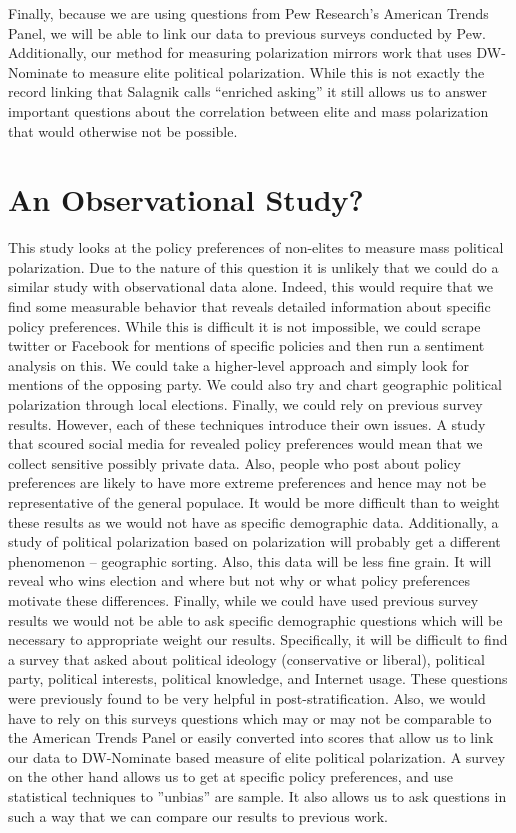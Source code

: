 \documentclass[12pt]{article}
\begin{document}
 Finally, because we are using questions from Pew Research's American Trends Panel, we will be able to link our data to previous surveys conducted by Pew. Additionally, our method for measuring polarization mirrors work that uses DW-Nominate to measure elite political polarization. While this is not exactly the record linking that Salagnik calls “enriched asking” it still allows us to answer important questions about the correlation between elite and mass polarization that would otherwise not be possible. 

\section{An Observational Study?}

 This study looks at the policy preferences of non-elites to measure mass political polarization. Due to the nature of this question it is unlikely that we could do a similar study with observational data alone. Indeed, this would require that we find some measurable behavior that reveals detailed information about specific policy preferences. While this is difficult it is not impossible, we could scrape twitter or Facebook for mentions of specific policies and then run a sentiment analysis on this. We could take a higher-level approach and simply look for mentions of the opposing party. We could also try and chart geographic political polarization through local elections. Finally, we could rely on previous survey results. However, each of these techniques introduce their own issues. A study that scoured social media for revealed policy preferences would mean that we collect sensitive possibly private data. Also, people who post about policy preferences are likely to have more extreme preferences and hence may not be representative of the general populace. It would be more difficult than to weight these results as we would not have as specific demographic data. Additionally, a study of political polarization based on polarization will probably get a different phenomenon – geographic sorting. Also, this data will be less fine grain. It will reveal who wins election and where but not why or what policy preferences motivate these differences. Finally, while we could have used previous survey results we would not be able to ask specific demographic questions which will be necessary to appropriate weight our results. Specifically, it will be difficult to find a survey that asked about political ideology (conservative or liberal), political party, political interests, political knowledge, and Internet usage. These questions were previously found to be very helpful in post-stratification. Also, we would have to rely on this surveys questions which may or may not be comparable to the American Trends Panel or easily converted into scores that allow us to link our data to DW-Nominate based measure of elite political polarization. A survey on the other hand allows us to get at specific policy preferences, and use statistical techniques to ”unbias” are sample. It also allows us to ask questions in such a way that we can compare our results to previous work.
\end{document}

